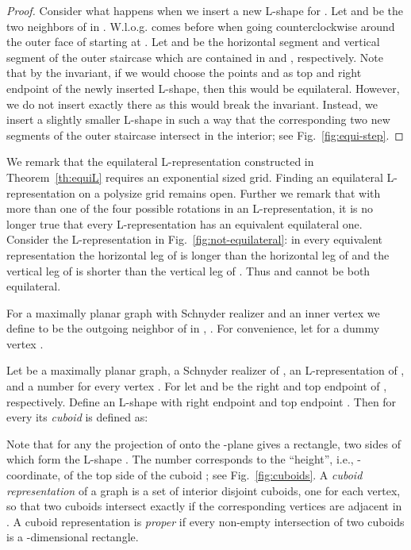\documentclass{llncs}
\begin{document}
\begin{proof}
 Consider what happens when we insert a new L-shape for . Let  and  be the two neighbors of  in . W.l.o.g.  comes before  when going counterclockwise around the outer face of  starting at . Let  and  be the horizontal segment and vertical segment of the outer staircase which are contained in  and , respectively. Note that by the invariant, if we would choose the points  and  as top and right endpoint of the newly inserted L-shape, then this would be equilateral. However, we do not insert  exactly there as this would break the invariant. Instead, we insert a
 slightly smaller L-shape in such a way that the corresponding two new segments of the outer staircase intersect  in the interior; see Fig.~\ref{fig:equi-step}.
\end{proof}

We remark that the equilateral L-representation constructed in Theorem~\ref{th:equiL} requires an exponential sized grid. Finding an equilateral L-representation on a polysize grid remains open. Further we remark that with more than one of the four possible rotations in an L-representation, it is no longer true that every L-representation has an equivalent equilateral one. Consider the L-representation in Fig.~\ref{fig:not-equilateral}: in every equivalent representation the horizontal leg of  is longer than the horizontal leg of  and the vertical leg of  is shorter than the vertical leg of . Thus  and  cannot be both equilateral.


For a maximally planar graph  with Schnyder realizer  and an inner vertex  we define  to be the outgoing neighbor of  in , . For convenience, let  for a dummy vertex .

\begin{definition}\label{def:cuboids}
 Let  be a maximally planar graph,  a Schnyder realizer of ,  an L-representation of , and  a number for every vertex . For  let  and  be the right and top endpoint of , respectively. Define an L-shape  with right endpoint  and top endpoint . Then for every  its \emph{cuboid} is defined as:
 
\end{definition}

Note that for any  the projection of  onto the -plane gives a rectangle, two sides of which form the L-shape . The number  corresponds to the ``height'', i.e., -coordinate, of the top side of the cuboid ; see Fig.~\ref{fig:cuboids}. A \emph{cuboid representation} of a graph  is a set of interior disjoint cuboids, one for each vertex, so that two cuboids intersect exactly if the corresponding vertices are adjacent in . A cuboid representation is \emph{proper} if every non-empty intersection of two cuboids is a -dimensional rectangle.
\end{document}
